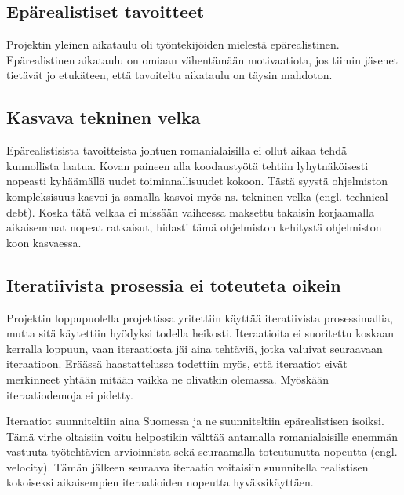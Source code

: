 \documentclass[a4paper]{article}
\begin{document}
\subsection{Epärealistiset tavoitteet}

Projektin yleinen aikataulu oli työntekijöiden mielestä epärealistinen. Epärealistinen aikataulu on omiaan vähentämään motivaatiota, jos tiimin jäsenet tietävät jo etukäteen, että tavoiteltu aikataulu on täysin mahdoton.

\subsection{Kasvava tekninen velka}

Epärealistisista tavoitteista johtuen romanialaisilla ei ollut aikaa tehdä kunnollista laatua. Kovan paineen alla koodaustyötä tehtiin lyhytnäköisesti nopeasti kyhäämällä uudet toiminnallisuudet kokoon. Tästä syystä ohjelmiston kompleksisuus kasvoi ja samalla kasvoi myös ns. tekninen velka (engl. technical debt). Koska tätä velkaa ei missään vaiheessa maksettu takaisin korjaamalla aikaisemmat nopeat ratkaisut, hidasti tämä ohjelmiston kehitystä ohjelmiston koon kasvaessa.

\subsection{Iteratiivista prosessia ei toteuteta oikein}

Projektin loppupuolella projektissa yritettiin käyttää iteratiivista prosessimallia, mutta sitä käytettiin hyödyksi todella heikosti. Iteraatioita ei suoritettu koskaan kerralla loppuun, vaan iteraatiosta jäi aina tehtäviä, jotka valuivat seuraavaan iteraatioon. Eräässä haastattelussa todettiin myös, että iteraatiot eivät merkinneet yhtään mitään vaikka ne olivatkin olemassa. Myöskään iteraatiodemoja ei pidetty.

Iteraatiot suunniteltiin aina Suomessa ja ne suunniteltiin epärealistisen isoiksi. Tämä virhe oltaisiin voitu helpostikin välttää antamalla romanialaisille enemmän vastuuta työtehtävien arvioinnista sekä seuraamalla toteutunutta nopeutta (engl. velocity). Tämän jälkeen seuraava iteraatio voitaisiin suunnitella realistisen kokoiseksi aikaisempien iteraatioiden nopeutta hyväksikäyttäen.
\end{document}
